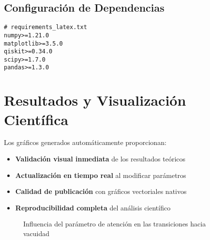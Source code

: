 \documentclass[12pt,a4paper]{article}
\begin{document}
\subsection{Configuración de Dependencias}

\begin{verbatim}
# requirements_latex.txt
numpy>=1.21.0
matplotlib>=3.5.0
qiskit>=0.34.0
scipy>=1.7.0
pandas>=1.3.0
\end{verbatim}

\section{Resultados y Visualización Científica}

Los gráficos generados automáticamente proporcionan:
\begin{itemize}
    \item \textbf{Validación visual inmediata} de los resultados teóricos
    \item \textbf{Actualización en tiempo real} al modificar parámetros
    \item \textbf{Calidad de publicación} con gráficos vectoriales nativos
    \item \textbf{Reproducibilidad completa} del análisis científico
\end{itemize}

\begin{figure}[htbp]
\centering
{}
\caption{Influencia del parámetro de atención en las transiciones hacia vacuidad}
\label{fig:attention_transition}
\end{figure}
\end{document}
